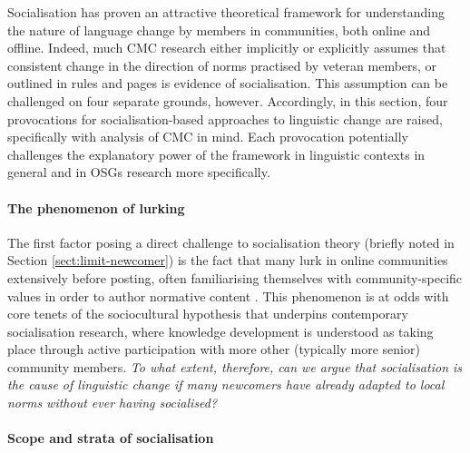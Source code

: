 Socialisation has proven an attractive theoretical framework for understanding the nature of language change by members in communities, both online and offline. Indeed, much \gls{CMC} research either implicitly or explicitly assumes that consistent change in the direction of norms practised by veteran members, or outlined in rules and  pages is evidence of socialisation. This assumption can be challenged on four separate grounds, however. Accordingly, in this section, four provocations for socialisation\hyp{}based approaches to linguistic change are raised, specifically with analysis of \gls{CMC} in mind. Each provocation potentially challenges the explanatory power of the framework in linguistic contexts in general and in \glspl{OSG} research more specifically. %

\paragraph{The phenomenon of lurking}

The first factor posing a direct challenge to socialisation theory (briefly noted in Section \ref{sect:limit-newcomer}) is the fact that many  lurk in online communities extensively before posting, often familiarising themselves with community\hyp{}specific values in order to author normative content \cite{weber_missed_2011}. This phenomenon is at odds with core tenets of the sociocultural hypothesis that underpins contemporary socialisation research, where knowledge development is understood as taking place through active participation with more other (typically more senior) community members. \emph{To what extent, therefore, can we argue that socialisation is the cause of linguistic change if many newcomers have already adapted to local norms without ever having socialised?}

\paragraph{Scope and strata of socialisation}

